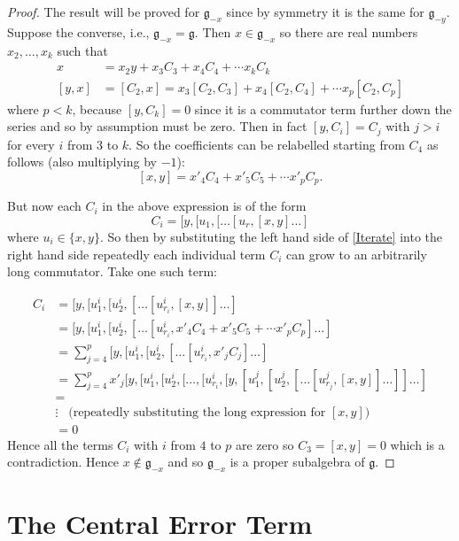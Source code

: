 \documentclass[honours]{UNSWthesis}
\newcommand{\g}{\mathfrak{g}}
\newcommand{\1}{\mathbf{e}_{1}}
\newcommand{\2}{\mathbf{e}_{3}}
\newcommand{\3}{\mathbf{e}_{3}}
\begin{document}
\begin{proof}
The result will be proved for $\g_{-x}$ since by symmetry it is the same for $\g_{-y}$. Suppose the converse, i.e., $\g_{-x}=\g$. Then $x \in \g_{-x}$ so there are real numbers $x_{2},\ldots,x_{k}$ such that
\begin{align*}
x&= x_{2}y +x_{3}C_{3}+ x_{4}C_{4}+\cdots x_{k}C_{k}\\
[y,x]&= [C_{2},x]=x_{3}[C_{2},C_{3}]+x_{4}[C_{2},C_{4}]+\cdots x_{p}[C_{2},C_{p}]
\end{align*}
where $p < k$, because $[y,C_{k}]=0$ since it is a commutator term further down the series and so by assumption must be zero. Then in fact $[y,C_{i}]=C_{j}$ with $j >i$ for every $i$ from $3$ to $k$. So the coefficients can be relabelled starting from $C_{4}$ as follows (also multiplying by $-1$):
\begin{equation}\label{Iterate}
[x,y]=x'_{4}C_{4}+x'_{5}C_{5}+\cdots x'_{p}C_{p}.
\end{equation}

But now each $C_{i}$ in the above expression is of the form 
\[
C_{i}=[y,[u_{1},[\ldots[u_{r},[x,y]\ldots]
\]
where $u_{i} \in \{x,y\}$. So then by substituting the left hand side of \ref{Iterate} into the right hand side repeatedly each individual term $C_{i}$ can grow to an arbitrarily long commutator. Take one such term: 
 
\begin{align*}
C_{i} &=[y,[u_{1}^{i},[u_{2}^{i},[\ldots[u_{r_{i}}^{i},[x,y]]\ldots]  \\
 &=[y,[u_{1}^{i},[u_{2}^{i},[\ldots [u_{r_{i}}^{i},x'_{4}C_{4}+x'_{5}C_{5}+\cdots x'_{p}C_{p}]\ldots]\\
 &=\sum\limits_{j=4}^{p}[y,[u_{1}^{i},[u_{2}^{i},[\ldots [u_{r_{i}}^{i},x'_{j}C_{j}]\ldots]\\
 &=\sum\limits_{j=4}^{p}x'_{j}[y,[u_{1}^{i},[u_{2}^{i},[\ldots,[u_{r_{i}}^{i},[y,[u_{1}^{j},[u_{2}^{j},[\ldots[u_{r_{j}}^{j},[x,y]]\ldots]]\ldots]\\
 &=\\
 &\vdots \;\;\; \text{(repeatedly substituting the long expression for $[x,y]$)}\\
 &=0
\end{align*}
Hence all the terms $C_{i}$ with $i$ from $4$ to $p$ are zero so $C_{3}=[x,y]=0$ which is a contradiction. Hence $x \notin \g_{-x}$ and so $\g_{-x}$ is a proper subalgebra of $\g$.
\end{proof}


\section{The Central Error Term}
\end{document}
